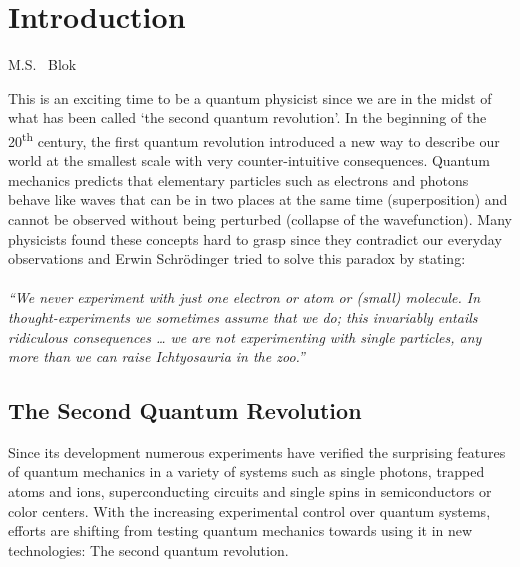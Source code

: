 \graphicspath{{./ch_introduction/figures/}}

\chapter{Introduction}
\label{ch:intro}

\begin{center} 
    \vspace{-1cm} {M.S. ~Blok} 
\end{center}

This is an exciting time to be a quantum physicist since we are in the midst of what has been called `the second quantum revolution'\cite{Dowling__2003}.
In the beginning of the 20\textsuperscript{th} century, the first quantum revolution introduced a new way to describe our world at the smallest scale with very counter-intuitive consequences. Quantum mechanics predicts that elementary particles such as electrons and photons behave like waves that can be in two places at the same time (superposition) and cannot be observed without being perturbed (collapse of the wavefunction). Many physicists found these concepts hard to grasp since they contradict our everyday observations and Erwin Schr\"{o}dinger tried to solve this paradox by stating\cite{Schrodinger__1952}: 
\\
\\
\textit{``We never experiment with just one electron or atom or (small) molecule. In  thought-experiments we sometimes assume that we do; this invariably entails ridiculous consequences … we are not experimenting with single particles, any more than we can raise Ichtyosauria in the zoo.''}
\\

\section{The Second Quantum Revolution}
Since its development numerous experiments have verified the surprising features of quantum mechanics in a variety of systems such as single photons, trapped atoms and ions, superconducting circuits and single spins in semiconductors or color centers. With the increasing experimental control over quantum systems, efforts are shifting from testing quantum mechanics towards using it in new technologies: The second quantum revolution.

